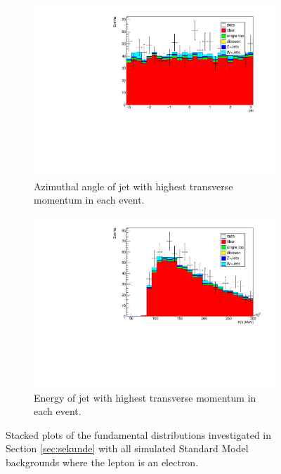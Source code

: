 \begin{figure}[H]
  \begin{subfigure}{0.45\textwidth}%
    \centering%
    \includegraphics[width=\textwidth]{plots/comparism/jet_phi_max.pdf}%
    \caption{Azimuthal angle of jet with highest transverse momentum in each event.}%
    \label{fig:6g}%
  \end{subfigure}%
  \hfill
  \begin{subfigure}{0.45\textwidth}%
    \centering%
    \includegraphics[width=\textwidth]{plots/comparism/jet_E_max.pdf}%
    \caption{Energy of jet with highest transverse momentum in each event.}%
    \label{fig:6h}%
  \end{subfigure}%
  \caption{Stacked plots of the fundamental distributions investigated in Section \ref{sec:sekunde} with all simulated Standard Model backgrounds where the lepton
  is an electron.}%
  \label{fig:6}%
\end{figure}


